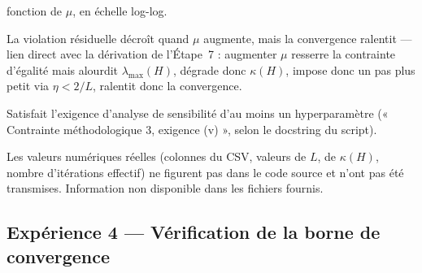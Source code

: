 \documentclass[11pt,a4paper]{article}
\begin{document}
\begin{description}[style=nextline]
  fonction de $\mu$, en échelle log-log.
  \item[Interprétation attendue] La violation résiduelle décroît quand $\mu$
  augmente, mais la convergence ralentit --- lien direct avec la dérivation
  de l'Étape~7 : augmenter $\mu$ resserre la contrainte d'égalité mais
  alourdit $\lambda_{\max}(H)$, dégrade donc $\kappa(H)$, impose donc un pas
  plus petit via $\eta < 2/L$, ralentit donc la convergence.
  \item[Lien avec la théorie] Satisfait l'exigence d'analyse de sensibilité
  d'au moins un hyperparamètre (« Contrainte méthodologique 3, exigence
  (v) », selon le docstring du script).
  \item[Limites] Les valeurs numériques réelles (colonnes du CSV, valeurs de
  $L$, de $\kappa(H)$, nombre d'itérations effectif) ne figurent pas dans le
  code source et n'ont pas été transmises. Information non disponible dans
  les fichiers fournis.
\end{description}

\subsection{Expérience 4 --- Vérification de la borne de convergence}
\end{document}
